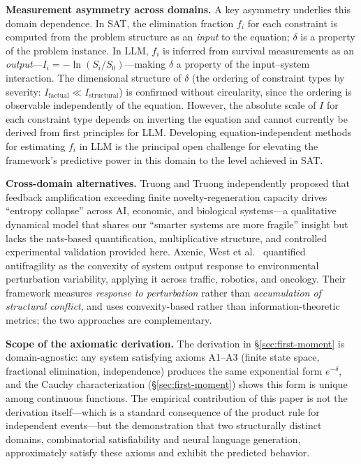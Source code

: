 \documentclass[11pt,a4paper]{article}
\begin{document}
\textbf{Measurement asymmetry across domains.} A key asymmetry underlies this domain dependence. In SAT, the elimination fraction $f_i$ for each constraint is computed from the problem structure as an \emph{input} to the equation; $\delta$ is a property of the problem instance. In LLM, $f_i$ is inferred from survival measurements as an \emph{output}---$I_i = -\ln(S_i/S_0)$---making $\delta$ a property of the input--system interaction. The dimensional structure of $\delta$ (the ordering of constraint types by severity: $I_{\text{factual}} \ll I_{\text{structural}}$) is confirmed without circularity, since the ordering is observable independently of the equation. However, the absolute scale of $I$ for each constraint type depends on inverting the equation and cannot currently be derived from first principles for LLM. Developing equation-independent methods for estimating $f_i$ in LLM is the principal open challenge for elevating the framework's predictive power in this domain to the level achieved in SAT.

\textbf{Cross-domain alternatives.} Truong and Truong \citep{truong2025entropy} independently proposed that feedback amplification exceeding finite novelty-regeneration capacity drives ``entropy collapse'' across AI, economic, and biological systems---a qualitative dynamical model that shares our ``smarter systems are more fragile'' insight but lacks the nats-based quantification, multiplicative structure, and controlled experimental validation provided here. Axenie, West et al.\ \citep{axenie2024antifragility} quantified antifragility as the convexity of system output response to environmental perturbation variability, applying it across traffic, robotics, and oncology. Their framework measures \emph{response to perturbation} rather than \emph{accumulation of structural conflict}, and uses convexity-based rather than information-theoretic metrics; the two approaches are complementary.

\textbf{Scope of the axiomatic derivation.} The derivation in \S\ref{sec:first-moment} is domain-agnostic: any system satisfying axioms A1--A3 (finite state space, fractional elimination, independence) produces the same exponential form $e^{-\delta}$, and the Cauchy characterization (\S\ref{sec:first-moment}) shows this form is unique among continuous functions. The empirical contribution of this paper is not the derivation itself---which is a standard consequence of the product rule for independent events---but the demonstration that two structurally distinct domains, combinatorial satisfiability and neural language generation, approximately satisfy these axioms and exhibit the predicted behavior.
\end{document}
